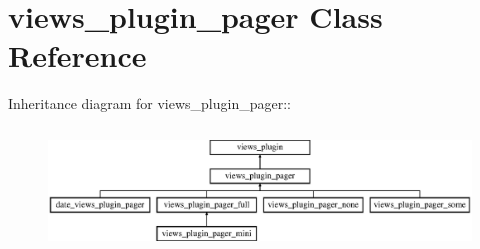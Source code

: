 \hypertarget{classviews__plugin__pager}{
\section{views\_\-plugin\_\-pager Class Reference}
\label{classviews__plugin__pager}
}
Inheritance diagram for views\_\-plugin\_\-pager::\begin{figure}[H]
\begin{center}
\leavevmode
\includegraphics[height=3.31361cm]{classviews__plugin__pager}
\end{center}
\end{figure}
